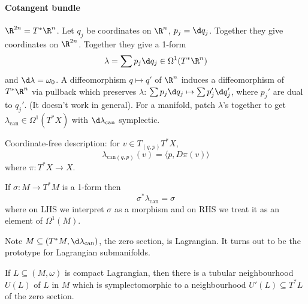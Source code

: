 \documentclass[a4paper]{article}
\begin{document}
\paragraph{Cotangent bundle}

\(\R^{2n} = T^*\R^n\). Let \(q_j\) be coordinates on \(\R^n\), \(p_j = \d q_j\). Together they give coordinates on \(\R^{2n}\). Together they give a 1-form
\[
  \lambda = \sum p_j \d q_j \in \Omega^1(T^*\R^n)
\]
and \(\d \lambda = \omega_0\). A diffeomorphism \(q \mapsto q'\) of \(\R^n\) induces a diffeomorphism of \(T^*\R^n\) via pullback which preserves \(\lambda\): \(\sum p_j \d q_j \mapsto \sum p_j' \d q_j'\), where \(p_j'\) are dual to \(q_j'\). (It doesn't work in general). For a manifold, patch \(\lambda\)'s together to get \(\lambda_{\mathrm{can}} \in \Omega^1(T^*X)\) with \(\d \lambda_{\mathrm{can}}\) symplectic.

Coordinate-free description: for \(v \in T_{(q, p)}T^*X\),
\[
  \lambda_{\mathrm{can} (q, p)}(v) = \langle p, D \pi(v) \rangle
\]
where \(\pi: T^*X \to X\).

\begin{ex}
  If \(\sigma: M \to T^*M\) is a 1-form then
  \[
    \sigma^* \lambda_{\mathrm{can}} = \sigma
  \]
  where on LHS we interpret \(\sigma\) as a morphism and on RHS we treat it as an element of \(\Omega^1(M)\).
\end{ex}

Note \(M \subseteq (T^*M, \d \lambda_{\mathrm{can}})\), the zero section, is Lagrangian. It turns out to be the prototype for Lagrangian submanifolds.

\begin{theorem}
  If \(L \subseteq (M, \omega)\) is compact Lagrangian, then there is a tubular neighbourhood \(U(L)\) of \(L\) in \(M\) which is symplectomorphic to a neighbourhood \(U'(L) \subseteq T^*L\) of the zero section.
\end{theorem}
\end{document}
